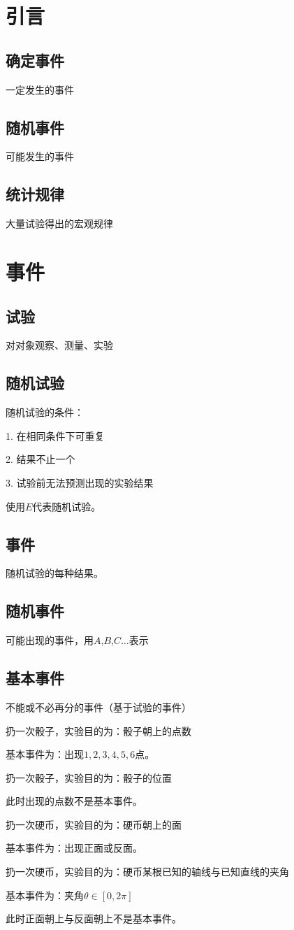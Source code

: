 \section{引言}%
\label{sec:引言}
\subsection{确定事件}%
\label{sub:确定事件}
一定发生的事件
\subsection{随机事件}
可能发生的事件
\subsection{统计规律}%
\label{sub:统计规律}
大量试验得出的宏观规律
\section{事件}%
\label{sec:事件}
\subsection{试验}%
\label{sub:试验}
对对象观察、测量、实验
\subsection{随机试验}%
\label{sub:随机试验}
随机试验的条件：

1. 在相同条件下可重复

2. 结果不止一个

3. 试验前无法预测出现的实验结果

使用$E$代表随机试验。
\subsection{事件}%
\label{sub:事件}
随机试验的每种结果。
\subsection{随机事件}%
\label{sub:随机事件}
可能出现的事件，用$A$,$B$,$C\dots$表示
\subsection{基本事件}%
\label{sub:基本事件}
不能或不必再分的事件（基于试验的事件）
\begin{eg}
	扔一次骰子，实验目的为：骰子朝上的点数

	基本事件为：出现$1,2,3,4,5,6$点。
\end{eg}
\begin{eg}
	扔一次骰子，实验目的为：骰子的位置

	此时出现的点数不是基本事件。
\end{eg}
\begin{eg}
	扔一次硬币，实验目的为：硬币朝上的面

	基本事件为：出现正面或反面。
\end{eg}
\begin{eg}
	扔一次硬币，实验目的为：硬币某根已知的轴线与已知直线的夹角

	基本事件为：夹角$\theta\in [0,2\pi]$

	此时正面朝上与反面朝上不是基本事件。
\end{eg}
